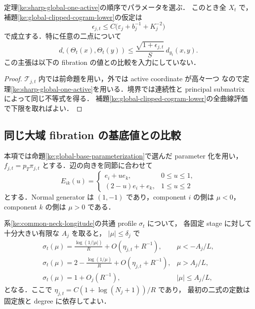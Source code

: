 \begin{corollary}
\label{ke:global-depth-lipschitz}
定理\ref{ke:sharp-global-one-active}の順序でパラメータを選ぶ．
このとき全 $X_t$ で，補題\ref{ke:global-clipped-cogram-lower}の仮定は
\[
 \epsilon_{j,t}\le C\bigl(\varepsilon_j+b_j^{-1}+K_j^{-2}\bigr)
\]
で成立する．特に任意の二点について
\begin{equation}\label{ke:eq:global-depth-lipschitz}
 d_\square(\Theta_t(x),\Theta_t(y))
 \le\frac{\sqrt{1+\epsilon_{j,t}}}{S}\,d_{g_t}(x,y).
\end{equation}
この主張は以下の fibration の値との比較を入力にしていない．
\end{corollary}

\begin{proof}
$\mathcal T_{j,t}$ 内では前命題を用い，外では active coordinate が高々一つ
なので定理\ref{ke:sharp-global-one-active}を用いる．境界では連続性と
principal submatrix によって同じ不等式を得る．
補題\ref{ke:global-clipped-cogram-lower}の全曲線評価で下限を取ればよい．
\end{proof}

\subsection{同じ大域 fibration の基底値との比較}

本項では命題\ref{ke:global-base-parameterization}で選んだ parameter 化を用い，
$f_{j,t}=p_T\pi_{j,t}$ とする．辺の向きを同節に合わせて
\[
 E_{ik}(u)=
 \begin{cases}e_i+u e_k,&0\le u\le1,\\
 (2-u)e_i+e_k,&1\le u\le2
 \end{cases}
\]
とする．Normal generator は $(1,-1)$ であり，component $i$ の側は
$\mu<0$，component $k$ の側は $\mu>0$ である．

\begin{lemma}
\label{ke:common-profile-log-depth}
系\ref{ke:common-neck-longitude}の共通 profile $\sigma_t$ について，
各固定 stage に対して十分大きい有限な $A_j$ を取ると，
$|\mu|\le\delta_j$ で
\[
\begin{array}{ll}
 \displaystyle
 \sigma_t(\mu)=\frac{\log(1/|\mu|)}R
       +O(\eta_{j,t}+R^{-1}),
       & \mu<-A_j/L,\\[4pt]
 \displaystyle
 \sigma_t(\mu)=2-\frac{\log(1/\mu)}R
       +O(\eta_{j,t}+R^{-1}),
       & \mu>A_j/L,\\[4pt]
 \displaystyle
 \sigma_t(\mu)=1+O_j(R^{-1}),
       &|\mu|\le A_j/L,
\end{array}
\]
となる．ここで $\eta_{j,t}=C(1+\log(N_j+1))/R$ であり，
最初の二式の定数は固定族と degree に依存してよい．
\end{lemma}

